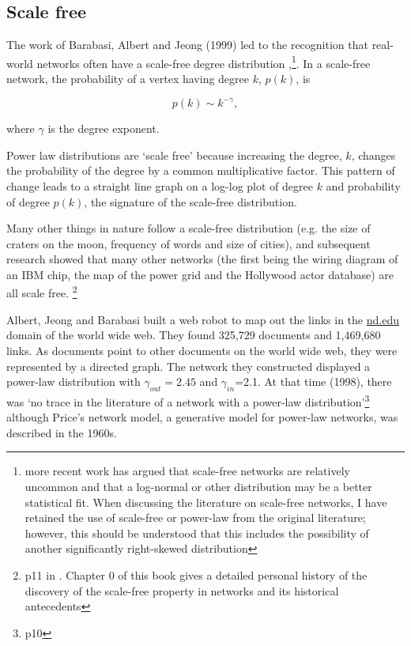 \subsection{Scale free}
\label{sec:scale_free}
The work of Barabasi, Albert and Jeong (1999) led to the recognition that real-world networks often have a scale-free degree distribution \cite{barabasi1999emergence},\cite{barabasi1999mean}\footnote{more recent work\cite{broido2019scale} has argued that scale-free networks are relatively uncommon and that a log-normal or other distribution may be a better statistical fit. When discussing the literature on scale-free networks, I have retained the use of scale-free or power-law from the original literature; however, this should be understood that this includes the possibility of another significantly right-skewed distribution}. In a scale-free network, the probability of a vertex having degree $k$, $p(k)$, is

\begin{equation}
    p(k) \sim k^{-\gamma},
\end{equation}
\label{eq:scale free}

where $\gamma$ is the degree exponent\cite{barabasi2016network}.

Power law distributions are `scale free' because increasing the degree, $k$, changes the probability of the degree by a common multiplicative factor. This pattern of change leads to a straight line graph on a log-log plot of degree $k$ and probability of degree $p(k)$, the signature of the scale-free distribution\cite{beltrami2013mathematical}. 

Many other things in nature follow a scale-free distribution (e.g. the size of craters on the moon, frequency of words and size of cities), and subsequent research showed that many other networks (the first being the wiring diagram of an IBM chip, the map of the power grid and the Hollywood actor database) are all scale free\cite{barabasi2016network}. \footnote{ p11 in \cite{barabasi2016network}. Chapter 0 of this book gives a detailed personal history of the discovery of the scale-free property in networks and its historical antecedents}

Albert, Jeong and Barabasi \cite{albert1999diameter} built a web robot to map out the links in the \url{nd.edu} domain of the world wide web. They found 325,729 documents and 1,469,680 links. As documents point to other documents on the world wide web, they were represented by a directed graph. The network they constructed displayed a power-law distribution with $\gamma_{out}=2.45$ and $\gamma_{in}$=2.1. At that time (1998), there was `no trace in the literature of a network with a power-law distribution'\cite{barabasi2016network}\footnote{p10} although  Price's network model, a generative model for power-law networks, was described in the 1960s\cite{price1965networks}. 

